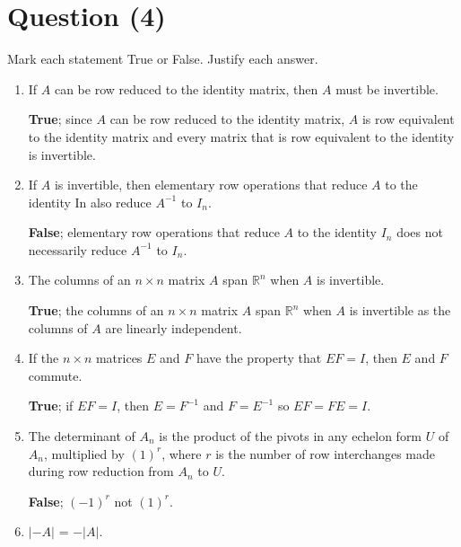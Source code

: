 \documentclass{zc-ust-hw}
\begin{document}
\newpage

\section*{Question (4)}

Mark each statement True or False. Justify each answer.

\begin{enumerate}[label=\roman*.]
  \item If $A$ can be row reduced to the identity matrix, then $A$ must be
    invertible. 
    \begin{center}
      \textbf{True}; since $A$ can be row reduced to the identity matrix, $A$
      is row equivalent to the identity matrix and every matrix that is row
      equivalent to the identity is invertible. 
    \qedsymbol\end{center}
  \item If $A$ is invertible, then elementary row operations that reduce $A$ to
    the identity In also reduce $A^{-1}$ to $I_n$. 
    \begin{center}
      \textbf{False}; elementary row operations that reduce $A$ to the identity
      $I_n$ does not necessarily reduce $A^{-1}$ to $I_n$. 
    \qedsymbol\end{center}
  \item The columns of an $n\times n$ matrix $A$ span $\mathbb{R}^n$ when $A$ is
    invertible. 
    \begin{center}
      \textbf{True}; the columns of an $n\times n$ matrix $A$ span
      $\mathbb{R}^n$ when $A$ is invertible as the columns of $A$ are
      linearly independent. 
    \qedsymbol\end{center}
  \item If the $n\times n$ matrices $E$ and $F$ have the property that $EF=I$, then
    $E$ and $F$ commute. 
    \begin{center}
      \textbf{True}; if $EF=I$, then $E=F^{-1}$ and $F=E^{-1}$ so $EF=FE=I$.
    \qedsymbol\end{center}
  \item The determinant of $A_n$ is the product of the pivots in any echelon
    form $U$ of $A_n$, multiplied by $(1)^r$, where $r$ is the number of row
    interchanges made during row reduction from $A_n$ to $U$. 
    \begin{center}
      \textbf{False}; $(-1)^r$ not $(1)^r$.
    \qedsymbol\end{center}
  \item $|-A|$ = $-|A|$. 

\end{enumerate}
\end{document}
